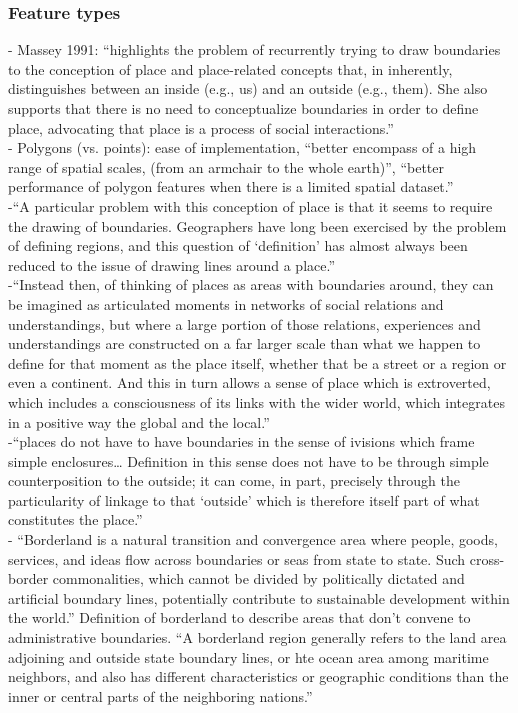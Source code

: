 \subsubsection{Feature types}
-{\color{orange} Massey 1991: “highlights the problem of recurrently trying to draw boundaries to the conception of place and place-related concepts that, in inherently, distinguishes between an inside (e.g., us) and an outside (e.g., them). She also supports that there is no need to conceptualize boundaries in order to define place, advocating that place is a process of social interactions.”} \cite{Acedo2019}\\
-{\color{orange} Polygons (vs. points): ease of implementation, “better encompass of a high range of spatial scales, (from an armchair to the whole earth)”, “better performance of polygon features when there is a limited spatial dataset.”} \cite{Acedo2019}\\
-{\color{orange}“A particular problem with this conception of place is that it seems to require the drawing of boundaries. Geographers have long been exercised by the problem of defining regions, and this question of ‘definition’ has almost always been reduced to the issue of drawing lines around  a place.”}\cite{MasseyD1991}\\
-{\color{orange}“Instead then, of thinking of places as areas with boundaries around, they can be imagined as articulated moments in networks of social relations and understandings, but where a large portion of those relations, experiences and understandings are constructed on a far larger scale than what we happen to define for that moment as the place itself, whether that be a street or a region or even a continent. And this in turn allows a sense of place which is extroverted, which includes a consciousness of its links with the wider world, which integrates in a positive way the global and the local.”}\cite{MasseyD1991}\\
-{\color{orange}“places do not have to have boundaries in the sense of ivisions which frame simple enclosures… Definition in this sense does not have to be through simple counterposition to the outside; it can come, in part, precisely through the particularity of linkage to that ‘outside’ which is therefore itself part of what constitutes the place.”}\cite{MasseyD1991}\\
-{\color{orange} “Borderland is a natural transition and convergence area where people, goods, services, and ideas flow across boundaries or seas from state to state. Such cross-border commonalities, which cannot be divided by politically dictated and artificial boundary lines, potentially contribute to sustainable development within the world.” Definition of borderland to describe areas that don’t convene to administrative boundaries. “A borderland region generally refers to the land area adjoining and outside state boundary lines, or hte ocean area among maritime neighbors, and also has different characteristics or geographic conditions than the inner or central parts of the neighboring nations.”}\cite{Xing2015}\\
